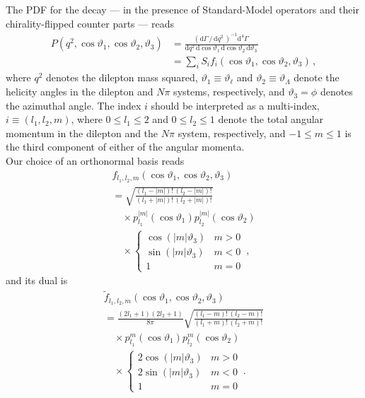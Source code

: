\documentclass[aps,nofootinbib,preprintnumbers,prd,twocolumn]{revtex4-1}
\newcommand{\rmdx}[1]{\mbox{d} #1 \,} %
\renewcommand{\theta}{\vartheta}
\begin{document}
The PDF for the decay --- in the presence of Standard-Model operators and their chirality-flipped counter parts --- reads \cite{Boer:2014kda}
\begin{equation}
\begin{aligned}
    P(q^2, \cos\theta_1, \cos\theta_2, \theta_3)
        & = \frac{(\rmdx{\Gamma} /\, \rmdx{q^2})^{-1} \rmdx{^4\Gamma}}{\rmdx{q^2} \rmdx{\cos\theta_1} \rmdx{\cos\theta_2} \rmdx{\theta_3}}\\
        & = \sum_i S_i f_i(\cos\theta_1, \cos\theta_2, \theta_3)\,,
\end{aligned}
\end{equation}
where $q^2$ denotes the dilepton mass squared, $\theta_1 \equiv \theta_\ell$ and $\theta_2 \equiv \theta_\Lambda$ denote the
helicity angles in the dilepton and
$N\pi$ systems, respectively, and $\theta_3 = \phi$ denotes the azimuthal angle.
The index $i$ should be interpreted as a multi-index, $i \equiv (l_1, l_2, m)$,
where $0 \leq l_1 \leq 2$ and $0 \leq l_2 \leq 1$ denote the total angular momentum in the
dilepton and the $N\pi$ system, respectively, and $-1 \leq m \leq 1$
is the third component of either of the angular momenta.\\

Our choice of an orthonormal basis reads
\begin{multline}
\label{eq:lambdab:bases1}
    f_{l_1, l_2, m}(\cos\theta_1, \cos\theta_2, \theta_3)\\
    = \sqrt{\frac{(l_1 - |m|)!\,(l_2 - |m|)!}{(l_1 + |m|)!\,(l_2 + |m|)!}}\\
    \quad \times p_{l_1}^{|m|}(\cos\theta_1) p_{l_2}^{|m|}(\cos\theta_2)\\
    \quad \times \begin{cases}
            \cos(|m|\theta_3) & m > 0\\
            \sin(|m|\theta_3) & m < 0\\
            1                 & m = 0
        \end{cases}\,,
\end{multline}
and its dual is
\begin{multline}
\label{eq:lambdab:bases2}
    \tilde{f}_{l_1, l_2, m}(\cos\theta_1, \cos\theta_2, \theta_3)\\
    = \frac{(2l_1 + 1)(2l_2 + 1)}{8\pi}\sqrt{\frac{(l_1 - m)!\,(l_2 - m)!}{(l_1 + m)!\,(l_2 + m)!}}\\
    \quad\times p_{l_1}^m(\cos\theta_1) p_{l_2}^m(\cos\theta_2)\\
    \quad \times \begin{cases}
            2 \cos(|m|\theta_3) & m > 0\\
            2 \sin(|m|\theta_3) & m < 0\\
            1                   & m = 0
        \end{cases}\,.\\
\end{multline}
\end{document}
